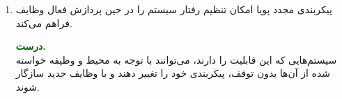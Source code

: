 \begin{enumerate}
\begin{qsolve}
	\end{qsolve}
	
	
	
	\item پیکربندی مجدد پویا امکان تنظیم رفتار سیستم را در حین پردازش فعال وظایف فراهم می‌کند.
	\begin{qsolve}
		\textbf{\textcolor{darkgreen}{درست.}}\\
		سیستم‌هایی که این قابلیت را دارند، می‌توانند با توجه به محیط و وظیفه خواسته شده از آن‌ها بدون توقف، پیکربندی خود را تغییر دهند و با وظایف جدید سازگار شوند.
	\end{qsolve}
	
	
\end{enumerate}
